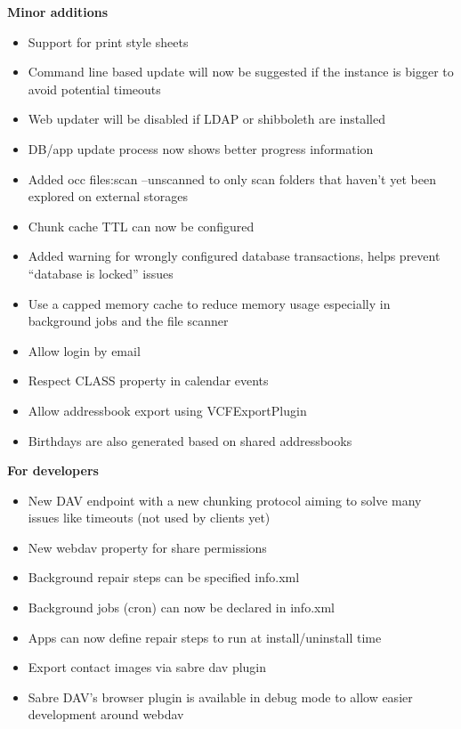 \documentclass[letterpaper,10pt,english]{sphinxmanual}
\begin{document}
\textbf{Minor additions}
\begin{itemize}
\item {} 
Support for print style sheets

\item {} 
Command line based update will now be suggested if the instance is bigger to avoid potential timeouts

\item {} 
Web updater will be disabled if LDAP or shibboleth are installed

\item {} 
DB/app update process now shows better progress information

\item {} 
Added occ files:scan --unscanned to only scan folders that haven't yet been explored on external storages

\item {} 
Chunk cache TTL can now be configured

\item {} 
Added warning for wrongly configured database transactions, helps prevent ``database is locked'' issues

\item {} 
Use a capped memory cache to reduce memory usage especially in background jobs and the file scanner

\item {} 
Allow login by email

\item {} 
Respect CLASS property in calendar events

\item {} 
Allow addressbook export using VCFExportPlugin

\item {} 
Birthdays are also generated based on shared addressbooks

\end{itemize}

\textbf{For developers}
\begin{itemize}
\item {} 
New DAV endpoint with a new chunking protocol aiming to solve many issues like timeouts (not used by clients yet)

\item {} 
New webdav property for share permissions

\item {} 
Background repair steps can be specified info.xml

\item {} 
Background jobs (cron) can now be declared in info.xml

\item {} 
Apps can now define repair steps to run at install/uninstall time

\item {} 
Export contact images via sabre dav plugin

\item {} 
Sabre DAV's browser plugin is available in debug mode to allow easier development around webdav

\end{itemize}
\end{document}
